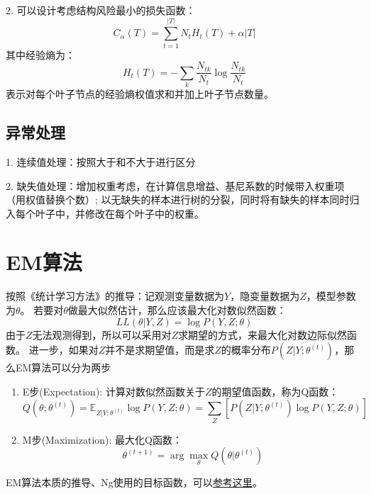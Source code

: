 2. 可以设计考虑结构风险最小的损失函数：
\begin{equation*}
    C_\alpha(T) = \sum_{t=1}^{|T|}N_t H_t(T) + \alpha |T|
\end{equation*}
其中经验熵为：
\begin{equation*}
    H_t(T) = -\sum_k \frac{N_{tk}}{N_t}\log\frac{N_{tk}}{N_t}
\end{equation*}
表示对每个叶子节点的经验熵权值求和并加上叶子节点数量。

\subsection{异常处理}
1. 连续值处理：按照大于和不大于进行区分

2. 缺失值处理：增加权重考虑，在计算信息增益、基尼系数的时候带入权重项（用权值替换个数）;
以无缺失的样本进行树的分裂，同时将有缺失的样本同时归入每个叶子中，并修改在每个叶子中的权重。


\section{EM算法}
按照《统计学习方法》的推导：记观测变量数据为$Y$，隐变量数据为$Z$，模型参数为$\theta$。
若要对$\theta$做最大似然估计，那么应该最大化对数似然函数：
\begin{equation*}
    LL(\theta|Y,Z) = \log P(Y,Z; \theta)
\end{equation*}
由于$Z$无法观测得到，所以可以采用对$Z$求期望的方式，来最大化对数边际似然函数。
进一步，如果对$Z$并不是求期望值，而是求$Z$的概率分布$P(Z|Y; \theta^{(t)})$，那么EM算法可以分为两步
\begin{enumerate}
\item E步(Expectation): 计算对数似然函数关于$Z$的期望值函数，称为Q函数：
\begin{equation*}
    Q(\theta;\theta^{(t)}) = \mathbb{E}_{Z|Y; \theta^{(t)}} \log P(Y,Z;\theta)
    = \sum_Z [P(Z|Y; \theta^{(t)}) \log P(Y,Z; \theta)]
\end{equation*}
\item M步(Maximization): 最大化Q函数：
\begin{equation*}
    \theta^{(t+1)} = \arg \max_\theta Q(\theta|\theta^{(t)})
\end{equation*}
\end{enumerate}

EM算法本质的推导、Ng使用的目标函数，可以\href{https://zhuanlan.zhihu.com/p/57679630}{参考这里}。

